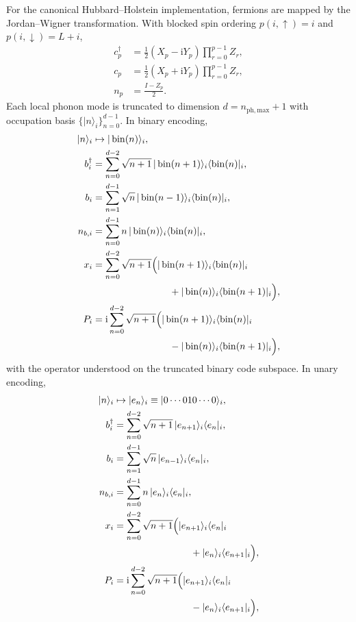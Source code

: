\documentclass[
  reprint,
  amsmath,
  amssymb,
  aps,
  pra,
  nofootinbib,
  superscriptaddress,
  floatfix
]{revtex4-2}
\newcommand{\ii}{\mathrm{i}}
\newcommand{\phmax}{n_{\mathrm{ph,max}}}
\newcommand{\ket}[1]{|#1\rangle}
\newcommand{\bra}[1]{\langle #1|}
\begin{document}
For the canonical Hubbard--Holstein implementation, fermions are mapped by the Jordan--Wigner transformation. With blocked spin ordering $p(i,\uparrow)=i$ and $p(i,\downarrow)=L+i$,
\begin{equation}
\begin{aligned}
c_p^{\dagger}&=\frac12(X_p-\ii Y_p)\prod_{r=0}^{p-1}Z_r,\\
c_p&=\frac12(X_p+\ii Y_p)\prod_{r=0}^{p-1}Z_r,\\
n_p&=\frac{I-Z_p}{2} .
\end{aligned}
\label{eq:jw_map}
\end{equation}
Each local phonon mode is truncated to dimension $d=\phmax+1$ with occupation basis $\{\ket{n}_i\}_{n=0}^{d-1}$. In binary encoding,
\begin{equation}
\begin{aligned}
\ket{n}_i&\mapsto \ket{\operatorname{bin}(n)}_i,\\
b_i^{\dagger}&=\sum_{n=0}^{d-2}\sqrt{n+1}\,\ket{\operatorname{bin}(n+1)}_i\bra{\operatorname{bin}(n)}_i,\\
b_i&=\sum_{n=1}^{d-1}\sqrt{n}\,\ket{\operatorname{bin}(n-1)}_i\bra{\operatorname{bin}(n)}_i,\\
n_{b,i}&=\sum_{n=0}^{d-1}n\,\ket{\operatorname{bin}(n)}_i\bra{\operatorname{bin}(n)}_i,\\
x_i&=\sum_{n=0}^{d-2}\sqrt{n+1}\Bigl(\ket{\operatorname{bin}(n+1)}_i\bra{\operatorname{bin}(n)}_i\\
&\qquad\qquad\qquad\qquad+\ket{\operatorname{bin}(n)}_i\bra{\operatorname{bin}(n+1)}_i\Bigr),\\
P_i&=\ii\sum_{n=0}^{d-2}\sqrt{n+1}\Bigl(\ket{\operatorname{bin}(n+1)}_i\bra{\operatorname{bin}(n)}_i\\
&\qquad\qquad\qquad\qquad-\ket{\operatorname{bin}(n)}_i\bra{\operatorname{bin}(n+1)}_i\Bigr),
\end{aligned}
\label{eq:boson_binary_encoding}
\end{equation}
with the operator understood on the truncated binary code subspace. In unary encoding,
\begin{equation}
\begin{aligned}
\ket{n}_i&\mapsto \ket{e_n}_i\equiv\ket{0\cdots 010\cdots 0}_i,\\
b_i^{\dagger}&=\sum_{n=0}^{d-2}\sqrt{n+1}\,\ket{e_{n+1}}_i\bra{e_n}_i,\\
b_i&=\sum_{n=1}^{d-1}\sqrt{n}\,\ket{e_{n-1}}_i\bra{e_n}_i,\\
n_{b,i}&=\sum_{n=0}^{d-1}n\,\ket{e_n}_i\bra{e_n}_i,\\
x_i&=\sum_{n=0}^{d-2}\sqrt{n+1}\Bigl(\ket{e_{n+1}}_i\bra{e_n}_i\\
&\qquad\qquad\qquad\qquad+\ket{e_n}_i\bra{e_{n+1}}_i\Bigr),\\
P_i&=\ii\sum_{n=0}^{d-2}\sqrt{n+1}\Bigl(\ket{e_{n+1}}_i\bra{e_n}_i\\
&\qquad\qquad\qquad\qquad-\ket{e_n}_i\bra{e_{n+1}}_i\Bigr),
\end{aligned}
\label{eq:boson_unary_encoding}
\end{equation}
\end{document}

